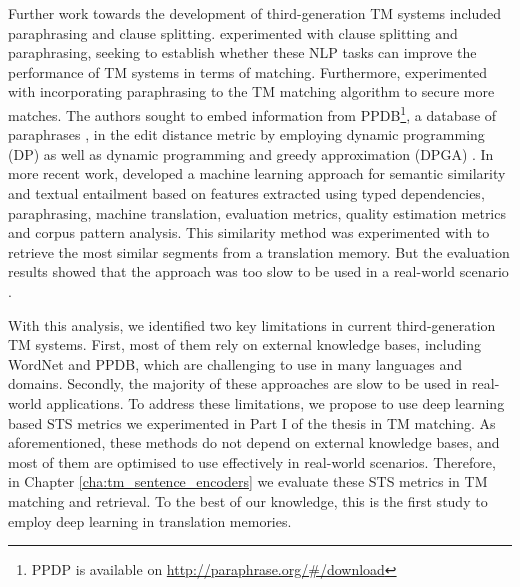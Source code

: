 Further work towards the development of third-generation TM systems included paraphrasing and clause splitting. \textcite{raisa-timonera-mitkov-2015-improving} experimented with clause splitting and paraphrasing, seeking to establish whether these NLP tasks can improve the performance of TM systems in terms of matching. Furthermore, \textcite{Gupta2016} experimented with incorporating paraphrasing to the TM matching algorithm to secure more matches. The authors sought to embed information from PPDB\footnote{PPDP is available on \url{http://paraphrase.org/\#/download}}, a database of paraphrases \autocite{ganitkevitch-etal-2013-ppdb}, in the edit distance metric by employing dynamic programming (DP) \autocite{Gupta2016}  as well as dynamic programming and greedy approximation (DPGA) \autocite{10.1007/978-3-319-45510-5_30}. In more recent work, \textcite{gupta-etal-2014-uow} developed a machine learning approach for semantic similarity and textual entailment based on features extracted using typed dependencies, paraphrasing, machine translation, evaluation metrics, quality estimation metrics and corpus pattern analysis. This similarity method was experimented with to retrieve the most similar segments from a translation memory. But the evaluation results showed that the approach was too slow to be used in a real-world scenario \autocite{gupta2014intelligent}. 

With this analysis, we identified two key limitations in current third-generation TM systems. First, most of them rely on external knowledge bases, including WordNet and PPDB, which are challenging to use in many languages and domains. Secondly, the majority of these approaches are slow to be used in real-world applications. To address these limitations, we propose to use deep learning based STS metrics we experimented in Part I of the thesis in TM matching. As aforementioned, these methods do not depend on external knowledge bases, and most of them are optimised to use effectively in real-world scenarios. Therefore, in Chapter \ref{cha:tm_sentence_encoders} we evaluate these STS metrics in TM matching and retrieval. To the best of our knowledge, this is the first study to employ deep learning in translation memories. 




